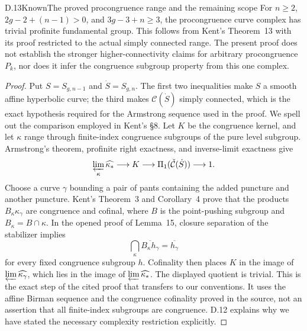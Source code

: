 \begin{result}{D.13}{Known}{The proved procongruence range and the remaining scope}
For $n\geq2$, $2g-2+(n-1)>0$, and $3g-3+n\geq3$, the procongruence curve complex has trivial profinite fundamental group. This follows from Kent's Theorem~13 with its proof restricted to the actual simply connected range. The present proof does not establish the stronger higher-connectivity claims for arbitrary procongruence $P_k$, nor does it infer the congruence subgroup property from this one complex.
\end{result}
\begin{proof}
Put $S=S_{g,n-1}$ and $\dot S=S_{g,n}$. The first two inequalities make $S$ a smooth affine hyperbolic curve; the third makes $\mathcal C(\dot S)$ simply connected, which is the exact hypothesis required for the Armstrong sequence used in the proof. We spell out the comparison employed in Kent's \S8. Let $K$ be the congruence kernel, and let $\kappa$ range through finite-index congruence subgroups of the pure level subgroup. Armstrong's theorem, profinite right exactness, and inverse-limit exactness give
\[
 \varprojlim_\kappa\widehat{\kappa_*}\longrightarrow K
 \longrightarrow\Pi_1(\check{\mathcal C}(\dot S))\longrightarrow1.
\]
Choose a curve $\gamma$ bounding a pair of pants containing the added puncture and another puncture. Kent's Theorem~3 and Corollary~4 prove that the products $B_\kappa\kappa_\gamma$ are congruence and cofinal, where $B$ is the point-pushing subgroup and $B_\kappa=B\cap\kappa$. In the opened proof of Lemma~15, closure separation of the stabilizer implies
\[
 \bigcap_\kappa\overline{B_\kappa h_\gamma}
       =\overline{h_\gamma}
\]
for every fixed congruence subgroup $h$. Cofinality then places $K$ in the image of $\varprojlim\widehat{\kappa_\gamma}$, which lies in the image of $\varprojlim\widehat{\kappa_*}$. The displayed quotient is trivial. This is the exact step of the cited proof that transfers to our conventions. It uses the affine Birman sequence and the congruence cofinality proved in the source, not an assertion that all finite-index subgroups are congruence. D.12 explains why we have stated the necessary complexity restriction explicitly.
\end{proof}

